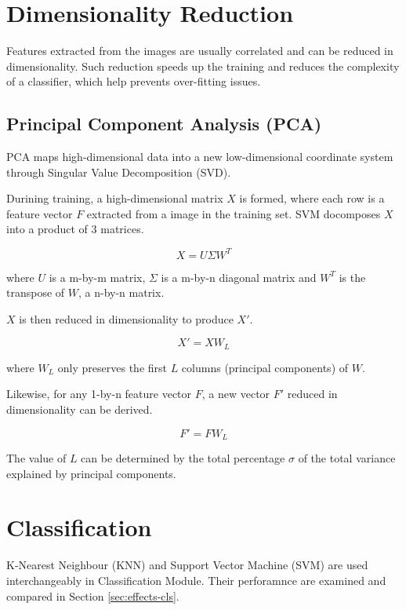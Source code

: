 \section{Dimensionality Reduction}
Features extracted from the images are usually correlated and can be reduced in dimensionality.
Such reduction speeds up the training and reduces the complexity of a classifier, which help prevents over-fitting issues.

\subsection{Principal Component Analysis (PCA)}
PCA maps high-dimensional data into a new low-dimensional coordinate system through Singular Value Decomposition (SVD).

Durining training, a high-dimensional matrix $X$ is formed, where each row is a feature vector $F$ extracted from a image in the training set.
SVM docomposes $X$ into a product of $3$ matrices.

\begin{equation}
X = U \Sigma W^T
\end{equation}

where $U$ is a m-by-m matrix, $\Sigma$ is a m-by-n diagonal matrix and $W^T$ is the transpose of $W$, a n-by-n matrix.

$X$ is then reduced in dimensionality to produce $X'$.

\begin{equation}
X' = X W_L
\end{equation}

where $W_L$ only preserves the first $L$ columns (principal components) of $W$.

Likewise, for any 1-by-n feature vector $F$, a new vector $F'$ reduced in dimensionality can be derived.

\begin{equation}
F' = F W_L
\end{equation}

The value of $L$ can be determined by the total percentage $\sigma$ of the total variance explained by principal components.

\section{Classification}
K-Nearest Neighbour (KNN) and Support Vector Machine (SVM) are used interchangeably in Classification Module. Their perforamnce are examined and compared in Section \ref{sec:effects-cls}.

